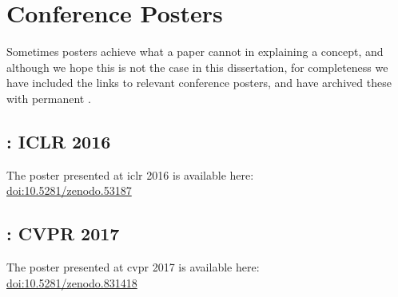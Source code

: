 \documentclass[thesis]{subfiles}
\begin{document}

\chapter{Conference Posters}
\label{posters}
Sometimes posters achieve what a paper cannot in explaining a concept, and although we hope this is not the case in this dissertation, for completeness we have included the links to relevant conference posters, and have archived these with permanent .
\section*{: ICLR 2016}
The poster presented at \gls{iclr} 2016 is available here:\\
\href{https://doi.org/10.5281/zenodo.53187}{doi:10.5281/zenodo.53187}
\section*{: CVPR 2017}
The poster presented at \gls{cvpr} 2017 is available here:\\
\href{https://doi.org/10.5281/zenodo.831418}{doi:10.5281/zenodo.831418}
\end{document}
